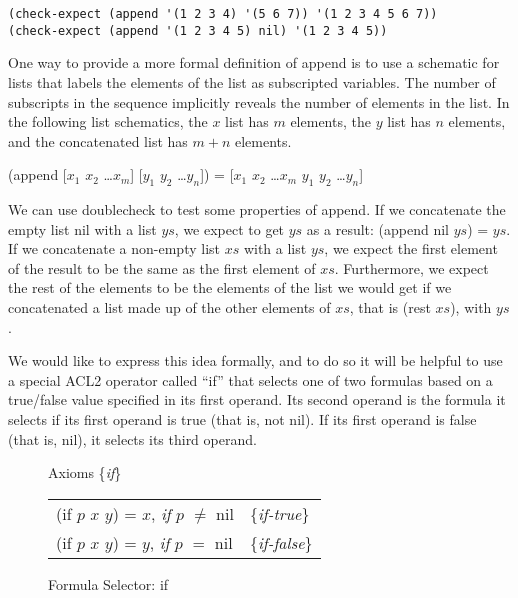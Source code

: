 \begin{Verbatim}
(check-expect (append '(1 2 3 4) '(5 6 7)) '(1 2 3 4 5 6 7))
(check-expect (append '(1 2 3 4 5) nil) '(1 2 3 4 5))
\end{Verbatim}

One way to provide a more formal definition of append is
to use a schematic for lists
that labels the elements of the list as subscripted variables.
The number of subscripts in the sequence implicitly reveals the number of elements in the list.
\label{list-schematic} In the following list schematics,
the $x$ list has $m$ elements, the $y$ list has $n$ elements,
and the concatenated list has $m+n$ elements.
\begin{samepage}
\begin{center}
(append [$x_1$ $x_2$ \dots $x_m$] [$y_1$ $y_2$ \dots $y_n$]) = [$x_1$ $x_2$ \dots $x_m$ $y_1$ $y_2$ \dots $y_n$]
\end{center}
\end{samepage}

We can use doublecheck to test some properties of append.
If we concatenate the empty list nil with a list $ys$,
we expect to get $ys$ as a result: (append nil $ys$) = $ys$.
If we concatenate a non-empty list $xs$ with a list $ys$,
we expect the first element of the result to be the same as
the first element of $xs$.
Furthermore, we expect the rest of the elements to be
the elements of the list we would get if we concatenated
a list made up of the other elements of $xs$, that is (rest $xs$),
with $ys$.

We would like to express this idea formally,
and to do so it will be helpful to use a special ACL2 operator
called ``if''
that selects one of two formulas based on a true/false
value specified in its first operand.
Its second operand is the formula it selects if
its first operand is true (that is, not nil).
If its first operand is false (that is, nil),
it selects its third operand.

\begin{figure}
\begin{center}
Axioms \{\emph{if}\} \\
\begin{tabular}{ll}
(if $p$ $x$ $y$) = $x$, \emph{if} $p$ $\neq$ nil  & \{\emph{if-true}\}  \\
(if $p$ $x$ $y$) = $y$, \emph{if} $p$ $=$ nil     & \{\emph{if-false}\} \\
\end{tabular}
\end{center}
\caption{Formula Selector: if}
\label{fig:if-axioms}
\end{figure}

